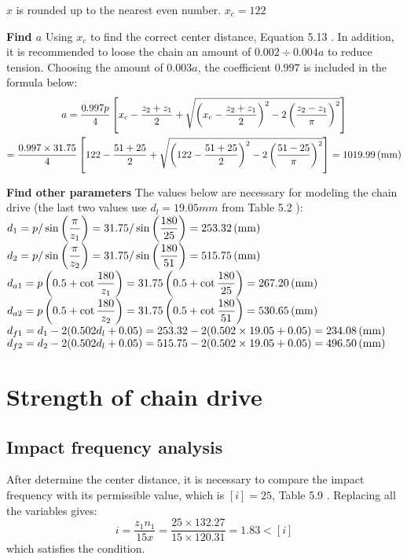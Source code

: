 $ x $ is rounded up to the nearest even number. $ x_c = 122$

\textbf{Find $ a $}
Using $ x_c $ to find the correct center distance, Equation 5.13 \cite{tk1}. In addition, it is recommended to loose the chain an amount of $ 0.002\div0.004 a $ to reduce tension. Choosing the amount of $ 0.003a $, the coefficient $ 0.997 $ is included in the formula below:
\begin{multline*}
	a = \dfrac{0.997p}{4}\left[x_c-\dfrac{z_2+z_1}{2}+\sqrt{\left(x_c-\dfrac{z_2+z_1}{2}\right)^2-2\left(\dfrac{z_2-z_1}{\pi}\right)^2}\right]\\ = \dfrac{0.997\times31.75}{4}\left[122-\dfrac{51+25}{2}+\sqrt{\left(122-\dfrac{51+25}{2}\right)^2-2\left(\dfrac{51-25}{\pi}\right)^2}\right]= 1019.99 \, (\mathrm{mm})
\end{multline*}

\textbf{Find other parameters} The values below are necessary for modeling the chain drive (the last two values use $ d_l = 19.05 \unit{mm} $ from Table 5.2 \cite{tk1}):\\ 
$ d_1 = p/\sin\left(\dfrac{\pi}{z_1}\right) = 31.75/\sin\left(\dfrac{180}{25}\right) = 253.32\, (\mathrm{mm})$\\
$ d_2 = p/\sin\left(\dfrac{\pi}{z_2}\right) = 31.75/\sin\left(\dfrac{180}{51}\right) = 515.75\, (\mathrm{mm})$\\
$ d_{a1} = p\left( 0.5 + \cot \dfrac{180}{z_1} \right) = 31.75 \left( 0.5 + \cot \dfrac{180}{25} \right) = 267.20 \, (\mathrm{mm})$\\
$ d_{a2} = p\left( 0.5 + \cot \dfrac{180}{z_2} \right) = 31.75 \left( 0.5 + \cot \dfrac{180}{51} \right) =  530.65 \, (\mathrm{mm})$\\
$ d_{f1} = d_1 - 2(0.502d_l+0.05) = 253.32 - 2(0.502\times 19.05+0.05) = 234.08 \, (\mathrm{mm})$\\
$ d_{f2} = d_2 - 2(0.502d_l+0.05) = 515.75 - 2(0.502\times 19.05+0.05) = 496.50 \, (\mathrm{mm})$

\section{Strength of chain drive}
\subsection{Impact frequency analysis}
After determine the center distance, it is necessary to compare the impact frequency with its permissible value, which  is $ [i]=25 $, Table 5.9 \cite{tk1}. Replacing all the variables gives:
\[i=\dfrac{z_1n_1}{15x}=\dfrac{25\times 132.27}{15\times 120.31}=1.83<[i]\]
which satisfies the condition.

